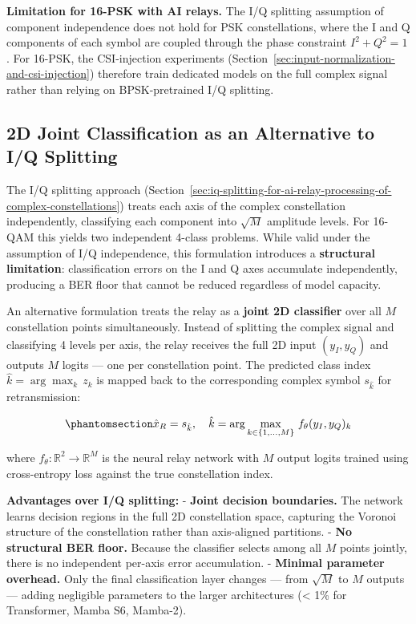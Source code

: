 \textbf{Limitation for 16-PSK with AI relays.} The I/Q splitting assumption of component independence does not hold for PSK constellations, where the I and Q components of each symbol are coupled through the phase constraint \(I^2 + Q^2 = 1\). For 16-PSK, the CSI-injection experiments (Section~\ref{sec:input-normalization-and-csi-injection}) therefore train dedicated models on the full complex signal rather than relying on BPSK-pretrained I/Q splitting.

\subsection{2D Joint Classification as an Alternative to I/Q Splitting}\label{sec:d-joint-classification-as-an-alternative-to-iq-splitting}

The I/Q splitting approach (Section~\ref{sec:iq-splitting-for-ai-relay-processing-of-complex-constellations}) treats each axis of the complex constellation independently, classifying each component into \(\sqrt{M}\) amplitude levels. For 16-QAM this yields two independent 4-class problems. While valid under the assumption of I/Q independence, this formulation introduces a \textbf{structural limitation}: classification errors on the I and Q axes accumulate independently, producing a BER floor that cannot be reduced regardless of model capacity.

An alternative formulation treats the relay as a \textbf{joint 2D classifier} over all \(M\) constellation points simultaneously. Instead of splitting the complex signal and classifying 4 levels per axis, the relay receives the full 2D input \((y_I, y_Q)\) and outputs \(M\) logits --- one per constellation point. The predicted class index \(\hat{k} = \arg\max_k \, z_k\) is mapped back to the corresponding complex symbol \(s_{\hat{k}}\) for retransmission:

\begin{equation}\protect\phantomsection\label{eq:joint-classification}{\hat{x}_R = s_{\hat{k}}, \quad \hat{k} = \arg\max_{k \in \{1, \dots, M\}} \, f_\theta(y_I, y_Q)_k
}\end{equation}

where \(f_\theta : \mathbb{R}^2 \to \mathbb{R}^M\) is the neural relay network with \(M\) output logits trained using cross-entropy loss against the true constellation index.

\textbf{Advantages over I/Q splitting:} - \textbf{Joint decision boundaries.} The network learns decision regions in the full 2D constellation space, capturing the Voronoi structure of the constellation rather than axis-aligned partitions. - \textbf{No structural BER floor.} Because the classifier selects among all \(M\) points jointly, there is no independent per-axis error accumulation. - \textbf{Minimal parameter overhead.} Only the final classification layer changes --- from \(\sqrt{M}\) to \(M\) outputs --- adding negligible parameters to the larger architectures (\textless{} 1\% for Transformer, Mamba S6, Mamba-2).

